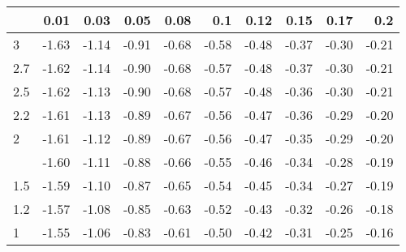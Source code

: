 
\begin{tabular}{lrrrrrrrrr}
\toprule
  & 0.01 & 0.03 & 0.05 & 0.08 & 0.1 & 0.12 & 0.15 & 0.17 & 0.2\\
\midrule
3 & -1.63 & -1.14 & -0.91 & -0.68 & -0.58 & -0.48 & -0.37 & -0.30 & -0.21\\
2.7 & -1.62 & -1.14 & -0.90 & -0.68 & -0.57 & -0.48 & -0.37 & -0.30 & -0.21\\
2.5 & -1.62 & -1.13 & -0.90 & -0.68 & -0.57 & -0.48 & -0.36 & -0.30 & -0.21\\
2.2 & -1.61 & -1.13 & -0.89 & -0.67 & -0.56 & -0.47 & -0.36 & -0.29 & -0.20\\
2 & -1.61 & -1.12 & -0.89 & -0.67 & -0.56 & -0.47 & -0.35 & -0.29 & -0.20\\
\addlinespace
1.7 & -1.60 & -1.11 & -0.88 & -0.66 & -0.55 & -0.46 & -0.34 & -0.28 & -0.19\\
1.5 & -1.59 & -1.10 & -0.87 & -0.65 & -0.54 & -0.45 & -0.34 & -0.27 & -0.19\\
1.2 & -1.57 & -1.08 & -0.85 & -0.63 & -0.52 & -0.43 & -0.32 & -0.26 & -0.18\\
1 & -1.55 & -1.06 & -0.83 & -0.61 & -0.50 & -0.42 & -0.31 & -0.25 & -0.16\\
\bottomrule
\end{tabular}
